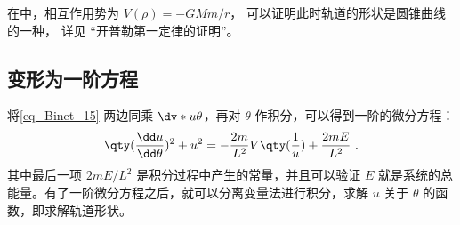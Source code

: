 在中，相互作用势为 $V(\rho)=-GMm/r$， 可以证明此时轨道的形状是圆锥曲线的一种， 详见 “开普勒第一定律的证明”。

\subsection{变形为一阶方程}
将\autoref{eq_Binet_15} 两边同乘 $\dv*{u}{\theta}$，再对 $\theta$ 作积分，可以得到一阶的微分方程：
\begin{equation}\label{eq_Binet_3}
\qty(\frac{\dd u}{\dd \theta})^2+u^2=-\frac{2m}{L^2}V\qty(\frac{1}{u})+\frac{2 m E}{L^2}~.
\end{equation}
其中最后一项 $2mE/L^2$ 是积分过程中产生的常量，并且可以验证 $E$ 就是系统的总能量。有了一阶微分方程之后，就可以分离变量法进行积分，求解 $u$ 关于 $\theta$ 的函数，即求解轨道形状。
